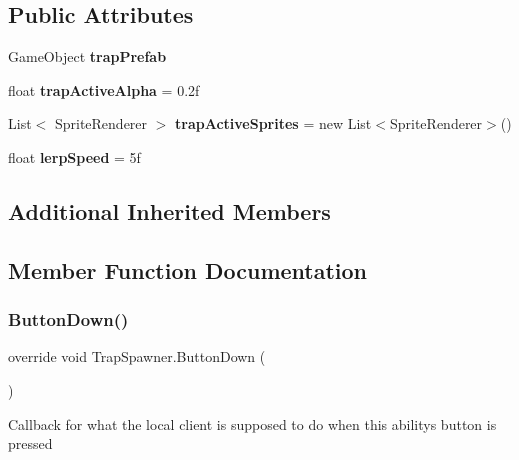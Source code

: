 \subsection*{Public Attributes}
\begin{DoxyCompactItemize}
\item 
\hypertarget{class_trap_spawner_a5eac34736f4342a82fa647182e1dc1d6}{}\label{class_trap_spawner_a5eac34736f4342a82fa647182e1dc1d6} 
Game\+Object {\bfseries trap\+Prefab}
\item 
\hypertarget{class_trap_spawner_a0cb75a63e22573dbfc1154afa826665e}{}\label{class_trap_spawner_a0cb75a63e22573dbfc1154afa826665e} 
float {\bfseries trap\+Active\+Alpha} = 0.\+2f
\item 
\hypertarget{class_trap_spawner_aad871adea31e403a52d0ed58930541d7}{}\label{class_trap_spawner_aad871adea31e403a52d0ed58930541d7} 
List$<$ Sprite\+Renderer $>$ {\bfseries trap\+Active\+Sprites} = new List$<$Sprite\+Renderer$>$()
\item 
\hypertarget{class_trap_spawner_abe7ad252927be3d467ad5ec6035936ae}{}\label{class_trap_spawner_abe7ad252927be3d467ad5ec6035936ae} 
float {\bfseries lerp\+Speed} = 5f
\end{DoxyCompactItemize}
\subsection*{Additional Inherited Members}


\subsection{Member Function Documentation}
\hypertarget{class_trap_spawner_ac214a69bf4c841b0c74bb159ceb912b9}{}\label{class_trap_spawner_ac214a69bf4c841b0c74bb159ceb912b9} 
\subsubsection{\texorpdfstring{Button\+Down()}{ButtonDown()}}
{\footnotesize\ttfamily override void Trap\+Spawner.\+Button\+Down (\begin{DoxyParamCaption}{ }\end{DoxyParamCaption})\hspace{0.3cm}{\ttfamily [virtual]}}



Callback for what the local client is supposed to do when this ability\textquotesingle{}s button is pressed 



